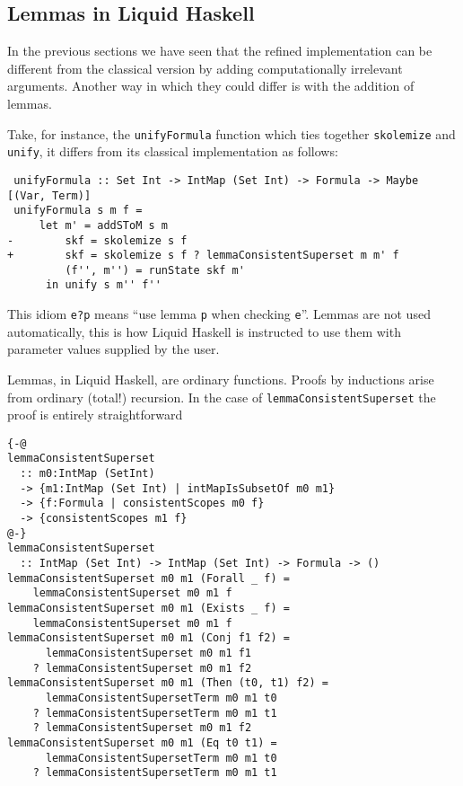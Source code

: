 \documentclass[sigconf, review]{acmart}
\newcommand{\tc}[1]{{\small\texttt{#1}}}
\begin{document}

\subsection{Lemmas in Liquid Haskell}
\label{sec:lh-lemmas}

In the previous sections we have seen that the refined implementation can be
different from the classical version by adding computationally irrelevant
arguments. Another way in which they could differ is with the addition of lemmas.

Take, for instance, the \tc{unifyFormula} function which ties together
\tc{skolemize} and \tc{unify}, it differs from its classical implementation as
follows:

\begin{verbatim}
 unifyFormula :: Set Int -> IntMap (Set Int) -> Formula -> Maybe [(Var, Term)]
 unifyFormula s m f =
     let m' = addSToM s m
-        skf = skolemize s f
+        skf = skolemize s f ? lemmaConsistentSuperset m m' f
         (f'', m'') = runState skf m'
      in unify s m'' f''
\end{verbatim}

This idiom \tc{e?p} means ``use lemma \tc{p} when checking \tc{e}''.
Lemmas are not used automatically, this is how Liquid
Haskell is instructed to use them with parameter values supplied by the user.

Lemmas, in Liquid Haskell, are ordinary functions. Proofs by inductions arise
from ordinary (total!) recursion. In the case of \tc{lemmaConsistentSuperset}
the proof is entirely straightforward

\begin{verbatim}
{-@
lemmaConsistentSuperset
  :: m0:IntMap (SetInt)
  -> {m1:IntMap (Set Int) | intMapIsSubsetOf m0 m1}
  -> {f:Formula | consistentScopes m0 f}
  -> {consistentScopes m1 f}
@-}
lemmaConsistentSuperset
  :: IntMap (Set Int) -> IntMap (Set Int) -> Formula -> ()
lemmaConsistentSuperset m0 m1 (Forall _ f) =
    lemmaConsistentSuperset m0 m1 f
lemmaConsistentSuperset m0 m1 (Exists _ f) =
    lemmaConsistentSuperset m0 m1 f
lemmaConsistentSuperset m0 m1 (Conj f1 f2) =
      lemmaConsistentSuperset m0 m1 f1
    ? lemmaConsistentSuperset m0 m1 f2
lemmaConsistentSuperset m0 m1 (Then (t0, t1) f2) =
      lemmaConsistentSupersetTerm m0 m1 t0
    ? lemmaConsistentSupersetTerm m0 m1 t1
    ? lemmaConsistentSuperset m0 m1 f2
lemmaConsistentSuperset m0 m1 (Eq t0 t1) =
      lemmaConsistentSupersetTerm m0 m1 t0
    ? lemmaConsistentSupersetTerm m0 m1 t1
\end{verbatim}
\end{document}
